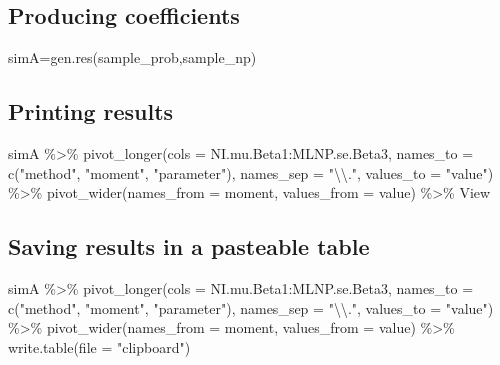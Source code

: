 \documentclass[
]{article}
\newenvironment{Shaded}{\begin{snugshade}}{\end{snugshade}}
\newcommand{\AttributeTok}[1]{\textcolor[rgb]{0.77,0.63,0.00}{#1}}
\newcommand{\FunctionTok}[1]{\textcolor[rgb]{0.00,0.00,0.00}{#1}}
\newcommand{\NormalTok}[1]{#1}
\newcommand{\OtherTok}[1]{\textcolor[rgb]{0.56,0.35,0.01}{#1}}
\newcommand{\SpecialCharTok}[1]{\textcolor[rgb]{0.00,0.00,0.00}{#1}}
\newcommand{\StringTok}[1]{\textcolor[rgb]{0.31,0.60,0.02}{#1}}
\begin{document}
\hypertarget{producing-coefficients}{%
\subsection{Producing coefficients}\label{producing-coefficients}}

\begin{Shaded}
\begin{Highlighting}[]
\NormalTok{simA}\OtherTok{=}\FunctionTok{gen.res}\NormalTok{(sample\_prob,sample\_np)}
\end{Highlighting}
\end{Shaded}

\hypertarget{printing-results}{%
\subsection{Printing results}\label{printing-results}}

\begin{Shaded}
\begin{Highlighting}[]
\NormalTok{simA }\SpecialCharTok{\%\textgreater{}\%} \FunctionTok{pivot\_longer}\NormalTok{(}\AttributeTok{cols =}\NormalTok{ NI.mu.Beta1}\SpecialCharTok{:}\NormalTok{MLNP.se.Beta3, }\AttributeTok{names\_to =} \FunctionTok{c}\NormalTok{(}\StringTok{"method"}\NormalTok{, }\StringTok{"moment"}\NormalTok{, }
    \StringTok{"parameter"}\NormalTok{), }\AttributeTok{names\_sep =} \StringTok{"}\SpecialCharTok{\textbackslash{}\textbackslash{}}\StringTok{."}\NormalTok{, }\AttributeTok{values\_to =} \StringTok{"value"}\NormalTok{) }\SpecialCharTok{\%\textgreater{}\%} \FunctionTok{pivot\_wider}\NormalTok{(}\AttributeTok{names\_from =}\NormalTok{ moment, }
    \AttributeTok{values\_from =}\NormalTok{ value) }\SpecialCharTok{\%\textgreater{}\%}\NormalTok{ View}
\end{Highlighting}
\end{Shaded}

\hypertarget{saving-results-in-a-pasteable-table}{%
\subsection{Saving results in a pasteable
table}\label{saving-results-in-a-pasteable-table}}

\begin{Shaded}
\begin{Highlighting}[]
\NormalTok{simA }\SpecialCharTok{\%\textgreater{}\%} \FunctionTok{pivot\_longer}\NormalTok{(}\AttributeTok{cols =}\NormalTok{ NI.mu.Beta1}\SpecialCharTok{:}\NormalTok{MLNP.se.Beta3, }\AttributeTok{names\_to =} \FunctionTok{c}\NormalTok{(}\StringTok{"method"}\NormalTok{, }\StringTok{"moment"}\NormalTok{, }
    \StringTok{"parameter"}\NormalTok{), }\AttributeTok{names\_sep =} \StringTok{"}\SpecialCharTok{\textbackslash{}\textbackslash{}}\StringTok{."}\NormalTok{, }\AttributeTok{values\_to =} \StringTok{"value"}\NormalTok{) }\SpecialCharTok{\%\textgreater{}\%} \FunctionTok{pivot\_wider}\NormalTok{(}\AttributeTok{names\_from =}\NormalTok{ moment, }
    \AttributeTok{values\_from =}\NormalTok{ value) }\SpecialCharTok{\%\textgreater{}\%} \FunctionTok{write.table}\NormalTok{(}\AttributeTok{file =} \StringTok{"clipboard"}\NormalTok{)}
\end{Highlighting}
\end{Shaded}
\end{document}
